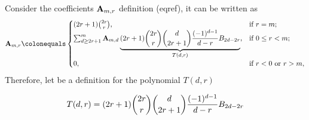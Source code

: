 Consider the coefficients ${\mathbf{A}} \sb{m,r}$ definition (eqref), it can be written as
\begin{equation*}
    \coeffA{m}{r} \colonequals
    \begin{cases}
    (2r+1)
        \binom{2r}{r}, & \text{if } r=m; \\
        \sum_{d \geq 2r+1}^{m} \coeffA{m}{d} \underbrace{(2r+1) \binom{2r}{r} \binom{d}{2r+1} \frac{(-1)^{d-1}}{d-r} \bernoulli{2d-2r}}_{T(d,r)}, & \text{if } 0 \leq r<m; \\
        0, & \text{if } r<0 \text{ or } r>m,
    \end{cases}
\end{equation*}
Therefore, let be a definition for the polynomial $T(d,r)$
\begin{defn}
    \begin{equation*}
        T(d,r) = (2r+1) \binom{2r}{r} \binom{d}{2r+1} \frac{(-1)^{d-1}}{d-r} {B}\sb{2d-2r}
    \end{equation*}
\end{defn}